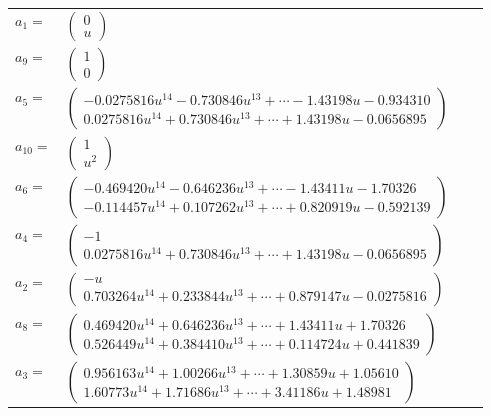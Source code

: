 \documentclass[1p]{elsarticle_modified}
\theoremstyle{definition}
\begin{document}
\begin{tabular}{m{7pt} m{180pt} m{7pt} m{180pt} }
\flushright $a_{1}=$&$\begin{pmatrix}0\\u\end{pmatrix}$ \\
\flushright $a_{9}=$&$\begin{pmatrix}1\\0\end{pmatrix}$ \\
\flushright $a_{5}=$&$\begin{pmatrix}-0.0275816 u^{14}-0.730846 u^{13}+\cdots-1.43198 u-0.934310\\0.0275816 u^{14}+0.730846 u^{13}+\cdots+1.43198 u-0.0656895\end{pmatrix}$ \\
\flushright $a_{10}=$&$\begin{pmatrix}1\\u^2\end{pmatrix}$ \\
\flushright $a_{6}=$&$\begin{pmatrix}-0.469420 u^{14}-0.646236 u^{13}+\cdots-1.43411 u-1.70326\\-0.114457 u^{14}+0.107262 u^{13}+\cdots+0.820919 u-0.592139\end{pmatrix}$ \\
\flushright $a_{4}=$&$\begin{pmatrix}-1\\0.0275816 u^{14}+0.730846 u^{13}+\cdots+1.43198 u-0.0656895\end{pmatrix}$ \\
\flushright $a_{2}=$&$\begin{pmatrix}- u\\0.703264 u^{14}+0.233844 u^{13}+\cdots+0.879147 u-0.0275816\end{pmatrix}$ \\
\flushright $a_{8}=$&$\begin{pmatrix}0.469420 u^{14}+0.646236 u^{13}+\cdots+1.43411 u+1.70326\\0.526449 u^{14}+0.384410 u^{13}+\cdots+0.114724 u+0.441839\end{pmatrix}$ \\
\flushright $a_{3}=$&$\begin{pmatrix}0.956163 u^{14}+1.00266 u^{13}+\cdots+1.30859 u+1.05610\\1.60773 u^{14}+1.71686 u^{13}+\cdots+3.41186 u+1.48981\end{pmatrix}$ \\

\end{tabular}
\end{document}
